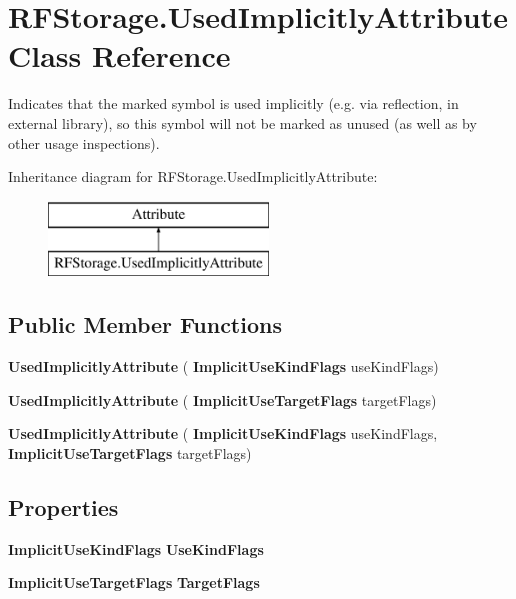 \section{R\+F\+Storage.\+Used\+Implicitly\+Attribute Class Reference}
\label{class_r_f_storage_1_1_used_implicitly_attribute}


Indicates that the marked symbol is used implicitly (e.\+g. via reflection, in external library), so this symbol will not be marked as unused (as well as by other usage inspections).  


Inheritance diagram for R\+F\+Storage.\+Used\+Implicitly\+Attribute\+:\begin{figure}[H]
\begin{center}
\leavevmode
\includegraphics[height=2.000000cm]{class_r_f_storage_1_1_used_implicitly_attribute}
\end{center}
\end{figure}
\subsection*{Public Member Functions}
\begin{DoxyCompactItemize}
\item 
\mbox{\label{class_r_f_storage_1_1_used_implicitly_attribute_a6efad3c8e882b3fbbba3d2fa6f7f88bc}} 
{\bfseries Used\+Implicitly\+Attribute} (\textbf{ Implicit\+Use\+Kind\+Flags} use\+Kind\+Flags)
\item 
\mbox{\label{class_r_f_storage_1_1_used_implicitly_attribute_a27b4b4f36f871f373d00c5da68dbf60e}} 
{\bfseries Used\+Implicitly\+Attribute} (\textbf{ Implicit\+Use\+Target\+Flags} target\+Flags)
\item 
\mbox{\label{class_r_f_storage_1_1_used_implicitly_attribute_a1f4ad1db9234ffe7382bdde09de102c2}} 
{\bfseries Used\+Implicitly\+Attribute} (\textbf{ Implicit\+Use\+Kind\+Flags} use\+Kind\+Flags, \textbf{ Implicit\+Use\+Target\+Flags} target\+Flags)
\end{DoxyCompactItemize}
\subsection*{Properties}
\begin{DoxyCompactItemize}
\item 
\mbox{\label{class_r_f_storage_1_1_used_implicitly_attribute_ab9e36ed5cfd5917dd41a9dfba527a3a4}} 
\textbf{ Implicit\+Use\+Kind\+Flags} {\bfseries Use\+Kind\+Flags}\hspace{0.3cm}{\ttfamily  [get]}
\item 
\mbox{\label{class_r_f_storage_1_1_used_implicitly_attribute_abf4dfcac998d0d067377eb23b04670b1}} 
\textbf{ Implicit\+Use\+Target\+Flags} {\bfseries Target\+Flags}\hspace{0.3cm}{\ttfamily  [get]}
\end{DoxyCompactItemize}



